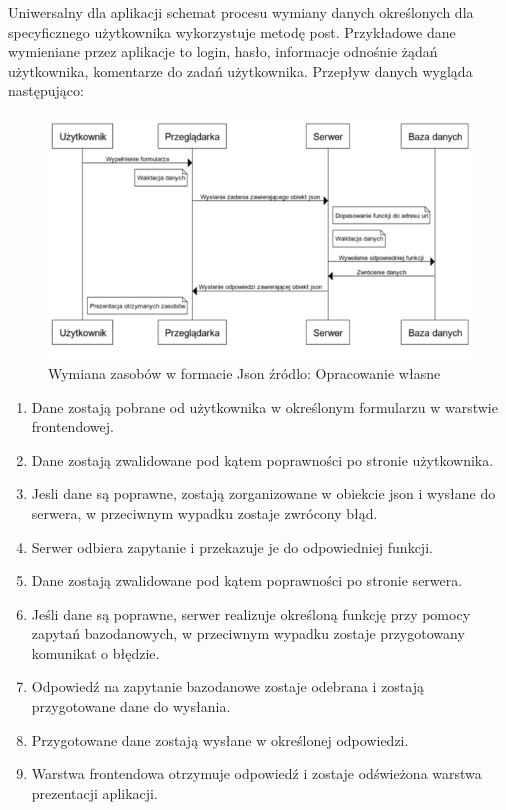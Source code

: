 \documentclass[12pt]{report}
\begin{document}
 Uniwersalny dla aplikacji schemat procesu wymiany danych określonych dla specyficznego użytkownika wykorzystuje metodę post.
Przykładowe dane wymieniane przez aplikacje to login, hasło, informacje odnośnie żądań użytkownika, komentarze do zadań użytkownika.
Przepływ danych wygląda następująco:
 \begin{figure}[!hb]
\centering
\includegraphics[width=\textwidth,height=\textheight,keepaspectratio]{U-P-S-B.png} 
\caption{Wymiana zasobów w formacie Json źródlo: Opracowanie własne}
\end{figure}
\begin{enumerate}
\item Dane zostają pobrane od użytkownika w określonym formularzu w warstwie frontendowej.
\item Dane zostają zwalidowane pod kątem poprawności po stronie użytkownika.
\item Jesli dane są poprawne, zostają zorganizowane w obiekcie json i wysłane do serwera, w przeciwnym wypadku zostaje zwrócony błąd.
\item Serwer odbiera zapytanie i przekazuje je do odpowiedniej funkcji.
\item Dane zostają zwalidowane pod kątem poprawności po stronie serwera.
\item Jeśli dane są poprawne, serwer realizuje określoną funkcję przy pomocy zapytań bazodanowych, w przeciwnym wypadku zostaje przygotowany komunikat o błędzie.
\item Odpowiedź na zapytanie bazodanowe zostaje odebrana i zostają przygotowane dane do wysłania.
\item Przygotowane dane zostają wysłane w określonej odpowiedzi.
\item Warstwa frontendowa otrzymuje odpowiedź i zostaje odświeżona warstwa prezentacji aplikacji.
\end{enumerate}
 
\end{document}
